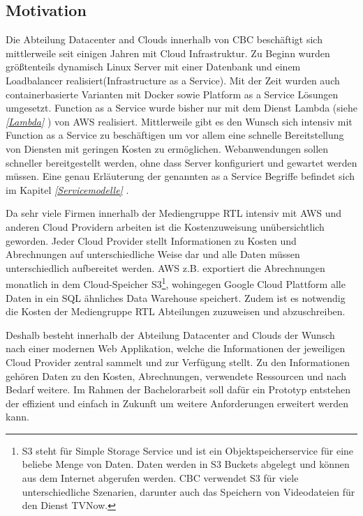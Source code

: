 \subsection{Motivation}
\label{Motivation}
Die Abteilung Datacenter and Clouds innerhalb von CBC beschäftigt sich mittlerweile seit einigen Jahren mit Cloud Infrastruktur.
Zu Beginn wurden größtenteils dynamisch Linux Server mit einer Datenbank und einem Loadbalancer realisiert(Infrastructure as a Service).
Mit der Zeit wurden auch containerbasierte Varianten mit Docker sowie Platform as a Service Lösungen umgesetzt.
Function as a Service wurde bisher nur mit dem Dienst Lambda (siehe \textit{\ref{Lambda} }) von AWS realisiert.
Mittlerweile gibt es den Wunsch sich intensiv mit Function as a Service zu beschäftigen um vor allem eine schnelle Bereitstellung von Diensten mit geringen Kosten zu ermöglichen.
Webanwendungen sollen schneller bereitgestellt werden, ohne dass Server konfiguriert und gewartet werden müssen.
Eine genau Erläuterung der genannten \glqq [...] as a Service\grqq{} Begriffe befindet sich im Kapitel \textit{\ref{Servicemodelle} }.

Da sehr viele Firmen innerhalb der Mediengruppe RTL intensiv mit AWS und anderen Cloud Providern arbeiten ist die Kostenzuweisung unübersichtlich geworden.
Jeder Cloud Provider stellt Informationen zu Kosten und Abrechnungen auf unterschiedliche Weise dar und alle Daten müssen unterschiedlich aufbereitet werden.
AWS z.B. exportiert die Abrechnungen monatlich in dem Cloud-Speicher
S3\footnote{S3 steht für Simple Storage Service und ist ein Objektspeicherservice für eine beliebe Menge von Daten.
Daten werden in S3 Buckets abgelegt und können aus dem Internet abgerufen werden.
CBC verwendet S3 für viele unterschiedliche Szenarien, darunter auch das Speichern von Videodateien für den Dienst TVNow.   }, wohingegen Google Cloud Plattform alle Daten in ein SQL ähnliches Data Warehouse speichert.
Zudem ist es notwendig die Kosten der Mediengruppe RTL Abteilungen zuzuweisen und abzuschreiben.

Deshalb besteht innerhalb der Abteilung Datacenter and Clouds der Wunsch nach einer modernen Web Applikation, welche die Informationen der jeweiligen Cloud Provider zentral sammelt und zur Verfügung stellt.
Zu den Informationen gehören Daten zu den Kosten, Abrechnungen, verwendete Ressourcen und nach Bedarf weitere.
Im Rahmen der Bachelorarbeit soll dafür ein Prototyp entstehen der effizient und einfach in Zukunft um weitere Anforderungen erweitert werden kann.
